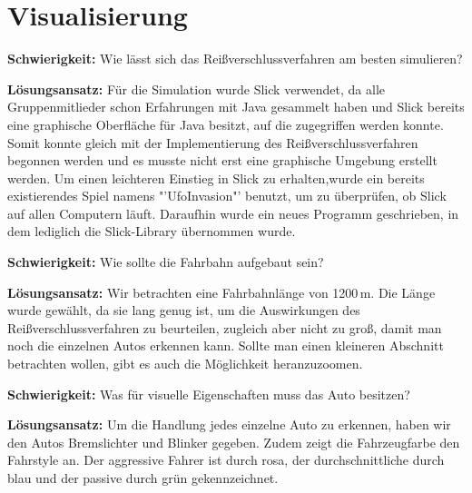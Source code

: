 \section{Visualisierung}
\textbf{Schwierigkeit:} Wie lässt sich das Reißverschlussverfahren am besten simulieren?
\begin{addmargin}[25pt]{0pt}
	\item \textbf{Lösungsansatz:} Für die Simulation wurde Slick verwendet, da alle Gruppenmitlieder schon Erfahrungen mit Java gesammelt haben und Slick bereits eine graphische Oberfläche für Java besitzt, auf die zugegriffen werden konnte. Somit konnte gleich mit der Implementierung des Reißverschlussverfahren begonnen werden und es musste nicht erst eine graphische Umgebung erstellt werden. Um einen leichteren Einstieg in Slick zu erhalten,wurde ein bereits existierendes Spiel namens "'UfoInvasion"' benutzt, um zu überprüfen, ob Slick auf allen Computern läuft. Daraufhin wurde ein neues Programm geschrieben, in dem lediglich die Slick-Library übernommen wurde. \\
\end{addmargin}
\textbf{Schwierigkeit:} Wie sollte die Fahrbahn aufgebaut sein?
\begin{addmargin}[25pt]{0pt}
	\item \textbf{Lösungsansatz:} Wir betrachten eine Fahrbahnlänge von 1200\,m. Die Länge wurde gewählt, da sie lang genug ist, um die Auswirkungen des Reißverschlussverfahren zu beurteilen, zugleich aber nicht zu groß, damit man noch die einzelnen Autos erkennen kann. Sollte man einen kleineren Abschnitt betrachten wollen, gibt es auch die Möglichkeit heranzuzoomen.\\
\end{addmargin}
\textbf{Schwierigkeit:} Was für visuelle Eigenschaften muss das Auto besitzen?
\begin{addmargin}[25pt]{0pt}
	\item \textbf{Lösungsansatz:} Um die Handlung jedes einzelne Auto zu erkennen, haben wir den Autos Bremslichter und Blinker gegeben. Zudem zeigt die Fahrzeugfarbe den Fahrstyle an. Der aggressive Fahrer ist durch rosa, der durchschnittliche durch blau und der passive durch grün gekennzeichnet.\\
\end{addmargin}


